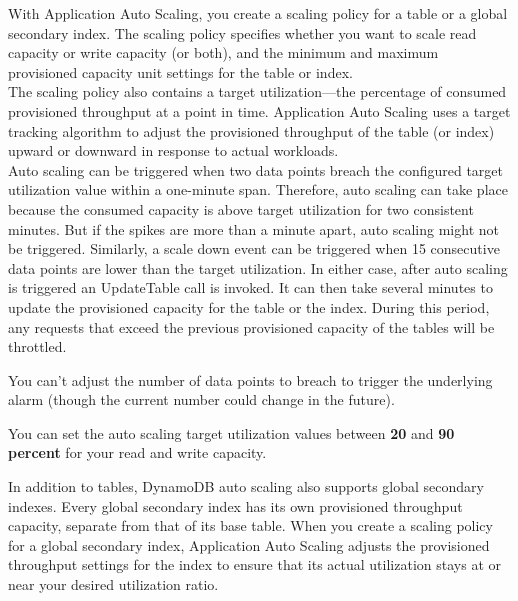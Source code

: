 \documentclass[12pt, letterpaper, twoside]{article}
\begin{document}
With Application Auto Scaling, you create a scaling policy for a table or a global secondary index. The scaling 
policy specifies whether you want to scale read capacity or write capacity (or both), and the minimum and maximum 
provisioned capacity unit settings for the table or index.\\
The scaling policy also contains a target utilization—the percentage of consumed provisioned throughput at a point 
in time. Application Auto Scaling uses a target tracking algorithm to adjust the provisioned throughput of the table 
(or index) upward or downward in response to actual workloads.\\

Auto scaling can be triggered when two data points breach the configured target utilization value within a one-minute 
span. Therefore, auto scaling can take place because the consumed capacity is above target utilization for two consistent 
minutes. But if the spikes are more than a minute apart, auto scaling might not be triggered. Similarly, a scale down 
event can be triggered when 15 consecutive data points are lower than the target utilization. In either case, after auto 
scaling is triggered an UpdateTable call is invoked. It can then take several minutes to update the provisioned capacity 
for the table or the index. During this period, any requests that exceed the previous provisioned capacity of the tables 
will be throttled.\\

\begin{tcolorbox}[colback=red!5!white,colframe=red!75!black,title=Important]
You can't adjust the number of data points to breach to trigger the underlying alarm (though the current number could change in the future).
\end{tcolorbox}

You can set the auto scaling target utilization values between \textbf{20} and \textbf{90 percent} for your read and write capacity.

\begin{tcolorbox}[colback=blue!5!white,colframe=blue!75!black,title=Important]
	In addition to tables, DynamoDB auto scaling also supports global secondary indexes. Every global secondary index has 
	its own provisioned throughput capacity, separate from that of its base table. When you create a scaling policy for 
	a global secondary index, Application Auto Scaling adjusts the provisioned throughput settings for the index to ensure 
	that its actual utilization stays at or near your desired utilization ratio.
\end{tcolorbox}
\end{document}
